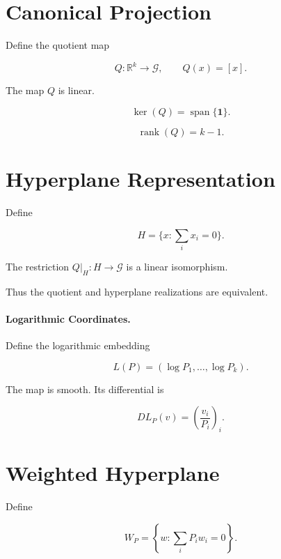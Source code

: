 \section{Canonical Projection}\label{ch:sec:canonical-projection}

Define the quotient map

\[
Q:\mathbb R^{k}\to\mathcal G,\qquad Q(x)=[x].
\]

\begin{proposition}
\label{ch:prop:2-2}
The map \(Q\) is linear.
\end{proposition}

\begin{proposition}
\label{ch:prop:2-3}
\[ \ker(Q)=\operatorname{span}\{\mathbf1\}. \]
\end{proposition}
\begin{corollary}
\label{ch:cor:2-4}
\[ \operatorname{rank}(Q)=k-1. \]
\end{corollary}

\section{Hyperplane Representation}\label{ch:sec:hyperplane-representation}

Define

\[
H=\{x:\sum_i x_i=0\}.
\]

\begin{proposition}
\label{ch:prop:2-5}
The restriction \(Q|_H:H\to\mathcal G\) is a linear isomorphism.
\end{proposition}

Thus the quotient and hyperplane realizations are equivalent.

\paragraph{Logarithmic Coordinates.}
Define the logarithmic embedding

\[
L(P)=(\log P_1,\ldots,\log P_k).
\]

The map is smooth.  Its differential is

\[
DL_P(v)=\left(\frac{v_i}{P_i}\right)_i.
\]

\section{Weighted Hyperplane}\label{ch:sec:weighted-hyperplane}

Define

\[
W_P = \left\{ w:\sum_iP_iw_i=0 \right\}.
\]

